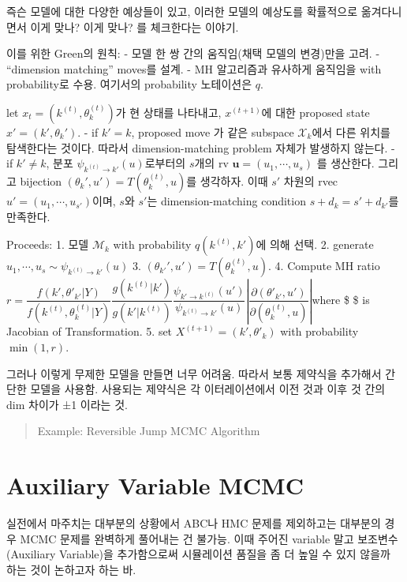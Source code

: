 \documentclass[
]{book}
\begin{document}
즉슨 모델에 대한 다양한 예상들이 있고, 이러한 모델의 예상도를 확률적으로 옮겨다니면서 이게 맞나? 이게 맞나? 를 체크한다는 이야기.

이를 위한 Green의 원칙:
- 모델 한 쌍 간의 움직임(채택 모델의 변경)만을 고려.
- ``dimension matching'' moves를 설계.
- MH 알고리즘과 유사하게 움직임을 with probability로 수용. 여기서의 probability 노테이션은 \(q\).

let \(x_t = (k^{(t)}, \theta_k^{(t)} )\)가 현 상태를 나타내고, \(x^{(t+1)}\)에 대한 proposed state \(x' = (k', \theta_k')\).
- if \(k'=k\), proposed move 가 같은 subspace \(\mathcal{X}_k\)에서 다른 위치를 탐색한다는 것이다. 따라서 dimension-matching problem 자체가 발생하지 않는다.
- if \(k' \not= k\), 분포 \(\psi_{k^{(t)} \rightarrow k'} (u)\)로부터의 \(s\)개의 rv \(\pmb u = (u_1 , \cdots, u_s)\) 를 생산한다. 그리고 bijection \((\theta_k ' , u' ) = T(\theta_k^{(t)}, u)\)를 생각하자. 이때 \(s'\) 차원의 rvec\(u' = (u_1 , \cdots, u_{s'})\)이며, \(s\)와 \(s'\)는 dimension-matching condition \(s+d_k = s' + d_{k'}\)를 만족한다.

Proceeds:
1. 모델 \(\mathcal{M}_k\) with probability \(q(k^{(t)}, k')\)에 의해 선택.
2. generate \(u_1 , \cdots, u_s \sim \psi_{k^{(t)} \rightarrow k'} (u)\)
3. \((\theta_{k'}', u') = T(\theta_k^{(t)}, u)\).
4. Compute MH ratio \(r = \dfrac {f(k', \theta'_{k'} \rvert Y) } {f(k^{(t)}, \theta^{(t)}_{k} \rvert Y) } \dfrac {g(k^{(t)} \rvert k')} {g(k' \rvert k^{(t)})} \dfrac {\psi_{k' \rightarrow k^{(t)}} (u')} {\psi_{k^{(t)} \rightarrow k'} (u)} \left\lvert {\dfrac{\partial (\theta'_{k'}, u')}{\partial (\theta^{(t)}_{k}, u)}} \right\rvert\)where \$ \$ is Jacobian of Transformation.
5. set \(X^{(t+1)} = (k', \theta'_{k})\) with probability \(\min (1,r)\).

그러나 이렇게 무제한 모델을 만들면 너무 어려움. 따라서 보통 제약식을 추가해서 간단한 모델을 사용함. 사용되는 제약식은 각 이터레이션에서 이전 것과 이후 것 간의 dim 차이가 ±1 이라는 것.

\begin{quote}
Example: Reversible Jump MCMC Algorithm
\end{quote}

\hypertarget{auxiliary-variable-mcmc}{%
\section{Auxiliary Variable MCMC}\label{auxiliary-variable-mcmc}}

실전에서 마주치는 대부분의 상황에서 ABC나 HMC 문제를 제외하고는 대부분의 경우 MCMC 문제를 완벽하게 풀어내는 건 불가능. 이때 주어진 variable 말고 보조변수 (Auxiliary Variable)을 추가함으로써 시뮬레이션 품질을 좀 더 높일 수 있지 않을까 하는 것이 논하고자 하는 바.
\end{document}
